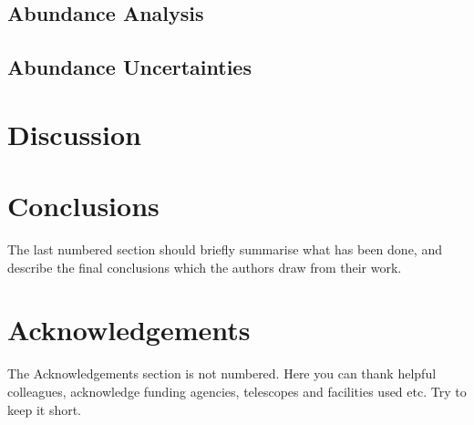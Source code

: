 \documentclass[a4paper,fleqn,usenatbib]{mnras}
\begin{document}
\subsection{Abundance Analysis}
\subsection{Abundance Uncertainties}

\section{Discussion}

\section{Conclusions}

The last numbered section should briefly summarise what has been done, and describe
the final conclusions which the authors draw from their work.

\section*{Acknowledgements}

The Acknowledgements section is not numbered. Here you can thank helpful
colleagues, acknowledge funding agencies, telescopes and facilities used etc.
Try to keep it short.
\end{document}
